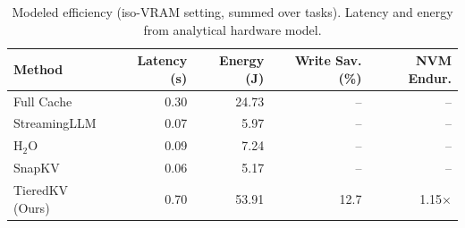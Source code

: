 \begin{table}[t]
\centering\small
\setlength{\tabcolsep}{4pt}
\caption{Modeled efficiency (iso-VRAM setting, summed over tasks). Latency and energy from analytical hardware model.}
\label{tab:efficiency}
\begin{tabular}{lrrrr}
\toprule
\textbf{Method} & \textbf{Latency (s)} & \textbf{Energy (J)} & \textbf{Write Sav. (\%)} & \textbf{NVM Endur.} \\
\midrule
Full Cache & 0.30 & 24.73 & -- & -- \\
StreamingLLM & 0.07 & 5.97 & -- & -- \\
H$_2$O & 0.09 & 7.24 & -- & -- \\
SnapKV & 0.06 & 5.17 & -- & -- \\
TieredKV (Ours) & 0.70 & 53.91 & 12.7 & 1.15× \\
\bottomrule
\end{tabular}
\end{table}
